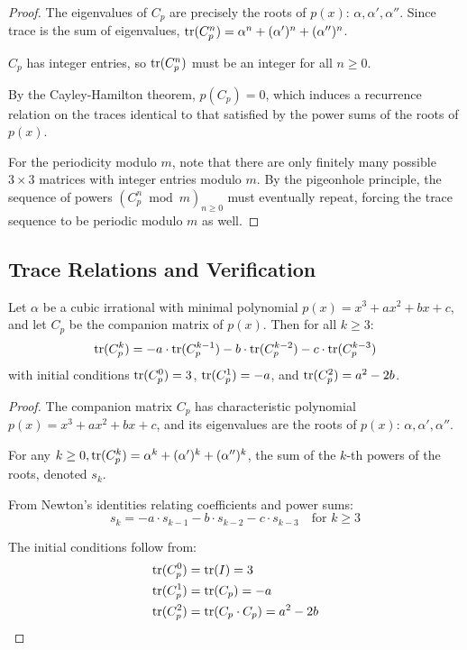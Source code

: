\begin{proof}
The eigenvalues of $C_p$ are precisely the roots of $p(x)$: $\alpha, \alpha', \alpha''$. Since trace is the sum of eigenvalues, $\operatorname{tr}(C_p^n) = \alpha^n + (\alpha')^n + (\alpha'')^n$.

$C_p$ has integer entries, so $\operatorname{tr}(C_p^n)$ must be an integer for all $n \geq 0$.

By the Cayley-Hamilton theorem, $p(C_p) = 0$, which induces a recurrence relation on the traces identical to that satisfied by the power sums of the roots of $p(x)$.

For the periodicity modulo $m$, note that there are only finitely many possible $3 \times 3$ matrices with integer entries modulo $m$. By the pigeonhole principle, the sequence of powers $(C_p^n \bmod m)_{n \geq 0}$ must eventually repeat, forcing the trace sequence to be periodic modulo $m$ as well.
\end{proof}

\subsection{Trace Relations and Verification}

\begin{theorem}\label{thm:trace_relations}\label{thm:matrix_cubic}
Let $\alpha$ be a cubic irrational with minimal polynomial $p(x) = x^3 + ax^2 + bx + c$, and let $C_p$ be the companion matrix of $p(x)$. Then for all $k \geq 3$:
\begin{equation}
\operatorname{tr}(C_p^k) = -a \cdot \operatorname{tr}(C_p^{k-1}) - b \cdot \operatorname{tr}(C_p^{k-2}) - c \cdot \operatorname{tr}(C_p^{k-3})
\end{equation}
with initial conditions $\operatorname{tr}(C_p^0) = 3$, $\operatorname{tr}(C_p^1) = -a$, and $\operatorname{tr}(C_p^2) = a^2-2b$.
\end{theorem}

\begin{proof}
The companion matrix $C_p$ has characteristic polynomial $p(x) = x^3 + ax^2 + bx + c$, and its eigenvalues are the roots of $p(x)$: $\alpha, \alpha', \alpha''$.

For any $k \geq 0, \operatorname{tr}(C_p^k) = \alpha^k + (\alpha')^k + (\alpha'')^k$, the sum of the $k$-th powers of the roots, denoted $s_k$.

From Newton's identities relating coefficients and power sums:
\begin{equation}
s_k = -a \cdot s_{k-1} - b \cdot s_{k-2} - c \cdot s_{k-3} \quad \text{for } k \geq 3
\end{equation}

The initial conditions follow from:
\begin{align}
\operatorname{tr}(C_p^0) &= \operatorname{tr}(I) = 3 \\
\operatorname{tr}(C_p^1) &= \operatorname{tr}(C_p) = -a \\
\operatorname{tr}(C_p^2) &= \operatorname{tr}(C_p \cdot C_p) = a^2-2b
\end{align}
\end{proof}

